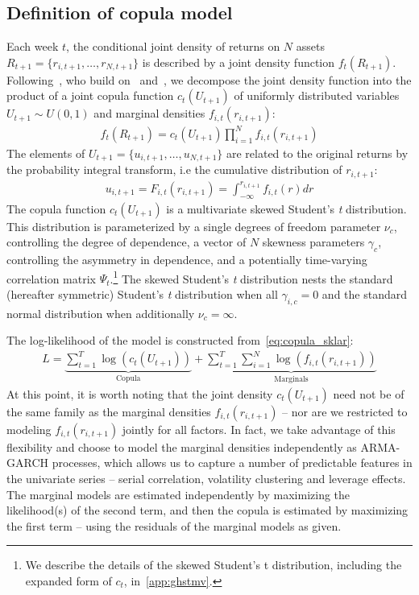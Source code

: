 
\subsection{Definition of copula model} %
\label{sub:definition_of_copula_model}

Each week $t$, the conditional joint density of returns on $N$ assets $R_{t+1} = \{r_{i,t+1},\ldots,r_{N,t+1}\}$ is described by a joint density function $f_t(R_{t+1})$. Following~\textcite{ChristoffersenErrunzaJacobLanglois2012}, who build on~\textcite{Patton2006} and~\textcite{Sklar1959}, we decompose the joint density function into the product of a joint copula function $c_t(U_{t+1})$ of uniformly distributed variables $U_{t+1} \sim U(0, 1)$ and marginal densities $f_{i,t}(r_{i,t+1})$:
\begin{align}
  f_t(R_{t+1}) =
    c_t(U_{t+1}) \prod^N_{i=1} f_{i,t}(r_{i,t+1})
  \label{eq:copula_sklar}
\end{align}
The elements of $U_{t+1} = \{u_{i,t+1},\ldots,u_{N,t+1}\}$ are related to the original returns by the probability integral transform, i.e the cumulative distribution of $r_{i,t+1}$:
\begin{align}
  u_{i,t+1} = F_{i,t}(r_{i,t+1}) = \int_{-\infty}^{r_{i,t+1}} f_{i,t}(r)dr
\end{align}
The copula function $c_t(U_{t+1})$ is a multivariate skewed Student's \emph{t} distribution. This distribution is parameterized by a single degrees of freedom parameter $\nu_c$, controlling the degree of dependence, a vector of $N$ skewness parameters $\gamma_c$, controlling the asymmetry in dependence, and a potentially time-varying correlation matrix $\Psi_{t}$.\footnote{We describe the details of the skewed Student's t distribution, including the expanded form of $c_t$, in~\autoref{app:ghstmv}.} The skewed Student's \emph{t} distribution nests the standard (hereafter symmetric) Student's \emph{t} distribution when all $\gamma_{i,c} = 0$ and the standard normal distribution when additionally $\nu_c = \infty$.

The log-likelihood of the model is constructed from~\autoref{eq:copula_sklar}:
\begin{align}
  L =
    \underbrace{\sum_{t=1}^T \log(c_t(U_{t+1}))}_\text{Copula} +
    \underbrace{\sum_{t=1}^T \sum_{i=1}^N \log(f_{i,t}(r_{i,t+1}))}_\text{Marginals}
\end{align}
At this point, it is worth noting that the joint density $c_t(U_{t+1})$ need not be of the same family as the marginal densities $f_{i,t}(r_{i,t+1})$ -- nor are we restricted to modeling $f_{i,t}(r_{i,t+1})$ jointly for all factors. In fact, we take advantage of this flexibility and choose to model the marginal densities independently as ARMA-GARCH processes, which allows us to capture a number of predictable features in the univariate series -- serial correlation, volatility clustering and leverage effects. The marginal models are estimated independently by maximizing the likelihood(s) of the second term, and then the copula is estimated by maximizing the first term -- using the residuals of the marginal models as given.

